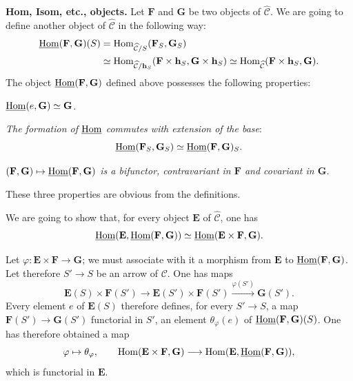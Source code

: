 \textbf{Hom, Isom, etc., objects.}
Let \(\mathbf{F}\) and \(\mathbf{G}\) be two objects of \(\widehat{\mathcal{C}}\). We are going to define another object of \(\widehat{\mathcal{C}}\) in the following way:
\[
\begin{aligned}
\underline{\operatorname{Hom}}(\mathbf{F},\mathbf{G})(S)
&=\operatorname{Hom}_{\widehat{\mathcal{C}}/S}(\mathbf{F}_S,\mathbf{G}_S)\\
&\simeq\operatorname{Hom}_{\widehat{\mathcal{C}}/\mathbf{h}_S}(\mathbf{F}\times\mathbf{h}_S,\mathbf{G}\times\mathbf{h}_S)
\simeq\operatorname{Hom}_{\widehat{\mathcal{C}}}(\mathbf{F}\times\mathbf{h}_S,\mathbf{G}).
\end{aligned}
\]
The object \(\underline{\operatorname{Hom}}(\mathbf{F},\mathbf{G})\) defined above possesses the following properties:
\begin{enumeratei}
\item \(\underline{\operatorname{Hom}}(e,\mathbf{G})\simeq\mathbf{G}\).
\item \emph{The formation of \(\underline{\operatorname{Hom}}\) commutes with extension of the base}:
\[
\underline{\operatorname{Hom}}(\mathbf{F}_S,\mathbf{G}_S)\simeq\underline{\operatorname{Hom}}(\mathbf{F},\mathbf{G})_S.
\]
\item \emph{\((\mathbf{F},\mathbf{G})\mapsto\underline{\operatorname{Hom}}(\mathbf{F},\mathbf{G})\) is a bifunctor, contravariant in \(\mathbf{F}\) and covariant in \(\mathbf{G}\).}
\end{enumeratei}
These three properties are obvious from the definitions.

We are going to show that, for every object \(\mathbf{E}\) of \(\widehat{\mathcal{C}}\), one has
\[
\underline{\operatorname{Hom}}(\mathbf{E},\underline{\operatorname{Hom}}(\mathbf{F},\mathbf{G}))\simeq\underline{\operatorname{Hom}}(\mathbf{E}\times\mathbf{F},\mathbf{G}).
\]

Let \(\varphi\colon\mathbf{E}\times\mathbf{F}\to\mathbf{G}\); we must associate with it a morphism from \(\mathbf{E}\) to \(\underline{\operatorname{Hom}}(\mathbf{F},\mathbf{G})\). Let therefore \(S'\to S\) be an arrow of \(\mathcal{C}\). One has maps
\[
\mathbf{E}(S)\times\mathbf{F}(S')\longrightarrow\mathbf{E}(S')\times\mathbf{F}(S')
\xrightarrow{\varphi(S')}\mathbf{G}(S').
\]
Every element \(e\) of \(\mathbf{E}(S)\) therefore defines, for every \(S'\to S\), a map \(\mathbf{F}(S')\to\mathbf{G}(S')\) functorial in \(S'\), \ie an element \(\theta_{\varphi}(e)\) of \(\underline{\operatorname{Hom}}(\mathbf{F},\mathbf{G})(S)\). One has therefore obtained a map
\[
\varphi\mapsto\theta_{\varphi},\qquad
\operatorname{Hom}(\mathbf{E}\times\mathbf{F},\mathbf{G})\longrightarrow\operatorname{Hom}(\mathbf{E},\underline{\operatorname{Hom}}(\mathbf{F},\mathbf{G})),
\]
which is \og functorial in \(\mathbf{E}\)\fg.

